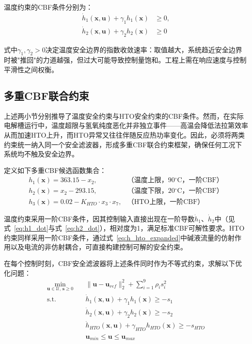 温度约束的CBF条件分别为：
\begin{equation}
  \begin{aligned}
    \dot{h}_1(\mathbf{x}, \mathbf{u}) + \gamma_1 h_1(\mathbf{x}) &\ge 0, \\
    \dot{h}_2(\mathbf{x}, \mathbf{u}) + \gamma_2 h_2(\mathbf{x}) &\ge 0
  \end{aligned}
  \label{eq:cbf_temperature}
\end{equation}

式中$\gamma_1, \gamma_2 > 0$决定温度安全边界的指数收敛速率：取值越大，系统趋近安全边界时被"推回"的力道越强，但过大可能导致控制量饱和。工程上需在响应速度与控制平滑性之间权衡。

\subsection{多重CBF联合约束}

上述两小节分别推导了温度安全约束与HTO安全约束的CBF条件。然而，在实际电解槽运行中，温度超限与氢氧纯度恶化并非独立事件——高温会降低法拉第效率从而加速HTO上升，而HTO异常又往往伴随反应热功率变化。因此，必须将两类约束统一纳入同一个安全滤波器，形成多重CBF联合约束框架，确保任何工况下系统均不触及安全边界。

定义如下多重CBF候选函数集合：
\begin{equation}
  \begin{array}{ll}
    h_1(\mathbf{x}) = 363.15 - x_2, & \text{（温度上限，90$^\circ$C，一阶CBF）} \\
    h_2(\mathbf{x}) = x_2 - 293.15, & \text{（温度下限，20$^\circ$C，一阶CBF）} \\
    h_3(\mathbf{x}) = 0.02 - K_{HTO} \cdot x_3 \cdot x_7, & \text{（HTO上限，一阶CBF）}
  \end{array}
  \label{eq:multi_cbf_set}
\end{equation}

温度约束采用一阶CBF条件，因其控制输入直接出现在一阶导数$\dot{h}_1$、$\dot{h}_2$中（见式~\eqref{eq:h1_dot}与式~\eqref{eq:h2_dot}），相对度为1，满足标准CBF可解性要求。HTO约束同样采用一阶CBF条件，通过式~\eqref{eq:h_hto_expanded}中碱液流量的仿射作用以及电流的非仿射耦合，可直接构建控制可解的安全约束。

在每个控制时刻，CBF安全滤波器将上述条件同时作为不等式约束，求解以下优化问题：
\begin{equation}
  \begin{aligned}
    \min_{\mathbf{u}\in\mathcal{U},\,\mathbf{s}\ge 0} \quad & \|\mathbf{u} - \mathbf{u}_{ref}\|_2^2 + \sum_{i=1}^{9} \rho_i s_i^2 \\
    \text{s.t.} \quad & \dot{h}_1(\mathbf{x}, \mathbf{u}) + \gamma_1 h_1(\mathbf{x}) \ge -s_1 \\
    & \dot{h}_2(\mathbf{x}, \mathbf{u}) + \gamma_2 h_2(\mathbf{x}) \ge -s_2 \\
    & \dot{h}_{HTO}(\mathbf{x}, \mathbf{u}) + \gamma_{HTO} h_{HTO}(\mathbf{x}) \ge -s_{HTO} \\
    & \mathbf{u}_{min} \le \mathbf{u} \le \mathbf{u}_{max}
  \end{aligned}
  \label{eq:cbf_optimization}
\end{equation}

